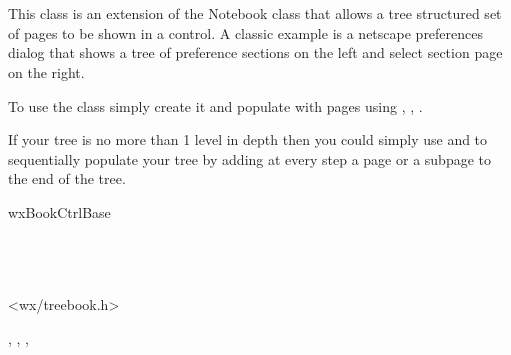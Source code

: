 
\section{}\label{wxtreebook}

This class is an extension of the Notebook class that allows a tree structured
set of pages to be shown in a control.
A classic example is a netscape preferences dialog that shows a tree
of preference sections on the left and select section page on the right.

To use the class simply create it and populate with pages using
,
,
.

If your tree is no more than 1 level in depth then you could
simply use  and 
 to sequentially populate your tree
by adding at every step a page or a subpage to the end of the tree.



wxBookCtrlBase\\
\\
\\
\\



<wx/treebook.h>





, , , 





\label{wxtreebookwxtreebook}

